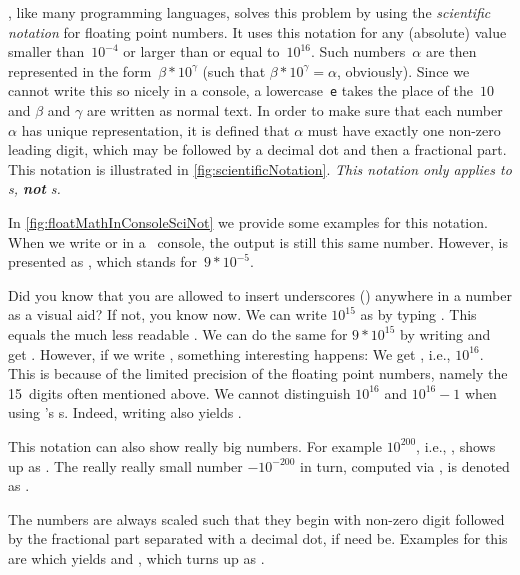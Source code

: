 \python, like many programming languages, solves this problem by using the \emph{scientific notation} for floating point numbers.
It uses this notation for any (absolute)  value smaller than~$10^{-4}$ or larger than or equal to~$10^{16}$.
Such numbers~$\alpha$ are then represented in the form~$\beta*10^{\gamma}$ (such that $\beta*10^{\gamma}=\alpha$, obviously).
Since we cannot write this so nicely in a console, a lowercase~\texttt{e} takes the place of the~$10$ and $\beta$ and $\gamma$ are written as normal text.
In order to make sure that each number~$\alpha$ has unique representation, it is defined that $\alpha$ must have exactly one non-zero leading digit, which may be followed by a decimal dot and then a fractional part.
This notation is illustrated in \cref{fig:scientificNotation}.
\emph{This notation only applies to s, \textbf{not} s.}

In \cref{fig:floatMathInConsoleSciNot} we provide some examples for this notation.
When we write  or  in a \python\ console, the output is still this same number.
However,  is presented as , which stands for~$9*10^{-5}$.%
%
\begin{sloppypar}%
Did you know that you are allowed to insert underscores (\pythonil{_}\pythonIdx{\_}) anywhere in a number as a visual aid?
If not, you know now.
We can write $10^{15}$ as  by typing .
This equals the much less readable .
We can do the same for $9*10^{15}$ by writing  and get .
However, if we write , something interesting happens:
We get , i.e., $10^{16}$.
This is because of the limited precision of the floating point numbers, namely the 15~digits often mentioned above.
We cannot distinguish $10^{16}$ and $10^{16}-1$ when using \python's s.
Indeed, writing  also yields .%
\end{sloppypar}%
%
This notation can also show really big numbers.
For example $10^{200}$, i.e., , shows up as .
The really really small number $-10^{-200}$ in turn, computed via , is denoted as .

The numbers are always scaled such that they begin with non-zero digit followed by the fractional part separated with a decimal dot, if need be.
Examples for this are  which yields  and , which turns up as .

